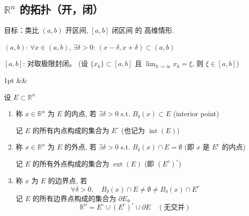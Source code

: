\documentclass[a4paper]{article}
\newenvironment{formal}[1][]{%
\def\FrameCommand{%
\hspace{1pt}%
{\color{formalline}\vrule width 2pt}%
{\color{formalshade}\vrule width 4pt}%
\colorbox{formalshade}%
}%
\MakeFramed{\advance\hsize-\width\FrameRestore}%
\noindent
\hspace{-4.55pt}%
\begin{adjustwidth}{}{1pt}%
\setlength{\parindent}{0pt}%
\vspace{3pt}%
\ifx&#1&\else %
\textbf{#1}\par
\vspace{1pt}%
\fi }{%
\vspace{2pt}%
\end{adjustwidth}\endMakeFramed%
}
\begin{document}
    \subsection{$\mathbb{R}^{n}$ 的拓扑（开，闭）}

    目标：类比 $(a, b)$ 开区间, $[a, b]$ 闭区间 的 高维情形.

    $(a, b)$: $\forall x \in (a, b)$, $\exists \delta > 0$: $(x - \delta, x + \delta
    ) \subset (a, b)$

    $[a, b]$: 对取极限封闭。 (设 $\{x_{k}\} \subset [a, b]$ 且
    $\lim_{k \to \infty}x_{k}= \xi$, 则 $\xi \in [a, b]$)

    \begin{formal}
        [Def (点与集合的关系)] 设 $E \subset \mathbb{R}^{n}$

        \begin{enumerate}
            \item 称 $x \in \mathbb{R}^{n}$ 为 $E$ 的内点, 若
                $\exists \delta > 0$ s.t. $B_{\delta}(x) \subset E$ (interior
                point)

                记 $E$ 的所有内点构成的集合为 $E^{\circ}$ (也记为 $\operatorname{int}
                (E)$)

                \begin{center}
                \end{center}

            \item 称 $x \in \mathbb{R}^{n}$ 为 $E$ 的外点, 若
                $\exists \delta > 0$ s.t. $B_{\delta}(x) \cap E = \emptyset$ (即
                $x$ 是 $E^{c}$ 的内点)

                记 $E$ 的所有外点构成的集合为 $\operatorname{ext}(E)$ (即 $(E^{c}
                )^{\circ}$)

            \item 称 $x$ 为 $E$ 的边界点, 若
                \[
                    \forall \delta > 0, \quad B_{\delta}(x) \cap E \neq \emptyset
                    \neq B_{\delta}(x) \cap E^{c}
                \]
                记 $E$ 的所有边界点构成的集合为 $\partial E$。
                \[
                    \mathbb{R}^{n}= E^{\circ}\cup (E^{c})^{\circ}\cup \partial E
                    \quad (\text{无交并})
                \]


\end{enumerate}
\end{formal}
\end{document}
